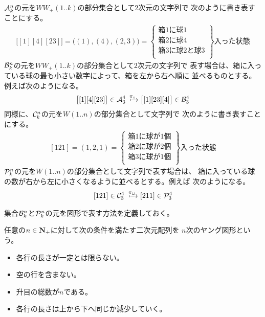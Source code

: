 	${{\mathcal{A}}}_k^n$の元を$WW_+(1..k)$の部分集合として$2$次元の文字列で
	次のように書き表すことにする。
	\begin{equation*}\begin{split} %
		\bigl[[1][4][23]\bigr] = \bigl((1),(4),(2,3)\bigr) 
		= \left\{\begin{array}{l}
			\text{箱$1$に球$1$} \\
			\text{箱$2$に球$4$} \\
			\text{箱$3$に球$2$と球$3$} \\
			\end{array}\right\}\text{入った状態}
	\end{split}\end{equation*} %
	${{\mathcal{B}}}_k^n$の元を$WW_+(1..k)$の部分集合として$2$次元の文字列で
	表す場合は、箱に入っている球の最も小さい数字によって、箱を左から右へ順に
	並べるものとする。例えば次のようになる。
	\begin{equation*}\begin{split} %
		\bigl[[1][4][23]\bigr]\in\mycal{A}_3^4 
			\xmapsto{\pi_\circ} \bigl[[1][23][4]\bigr]\in\mycal{B}_3^4
	\end{split}\end{equation*} %
	同様に、${{\mathcal{C}}}_k^n$の元を$W(1..n)$の部分集合として文字列で
	次のように書き表すことにする。
	\begin{equation*}\begin{split} %
		[121] = (1,2,1) = \left\{\begin{array}{l}
			\text{箱$1$に球が$1$個} \\
			\text{箱$2$に球が$2$個} \\
			\text{箱$3$に球が$1$個} \\
			\end{array}\right\}\text{入った状態}
	\end{split}\end{equation*} %
	${{\mathcal{P}}}_k^n$の元を$W(1..n)$の部分集合として文字列で表す場合は、
	箱に入っている球の数が右から左に小さくなるように並べるとする。例えば
	次のようになる。
	\begin{equation*}\begin{split} %
		[121]\in\mycal{C}_3^4 
			\xmapsto{\pi_\sqcup} [211]\in\mycal{P}_3^4
	\end{split}\end{equation*} %

	集合${{\mathcal{B}}}_k^n$と${{\mathcal{P}}}_k^n$の元を図形で表す方法を定義しておく。

	\begin{definition}[ヤング図形]\label{def:ヤング図形} %
		任意の$n\in{\ensuremath{\mathbf{N}}}_+$に対して次の条件を満たす二次元配列を
		$n$次のヤング図形という。
		\begin{itemize}\setlength{\itemsep}{-1mm} %
			\item 各行の長さが一定とは限らない。
			\item 空の行を含まない。
			\item 升目の総数が$n$である。
			\item 各行の長さは上から下へ同じか減少していく。
		\end{itemize} %
	\end{definition} %

